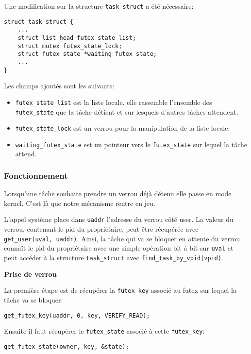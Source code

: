 Une modification sur la structure \verb|task_struct| a été nécessaire:

\begin{lstlisting}[tabsize=4]
struct task_struct {
	...
	struct list_head futex_state_list;
	struct mutex futex_state_lock;
	struct futex_state *waiting_futex_state;
	...
}
\end{lstlisting}

Les champs ajoutés sont les suivants:
\begin{itemize}
	\item \verb|futex_state_list| est la liste locale, elle rassemble l'ensemble des
	\verb|futex_state| que la tâche détient et sur lesquels d'autres tâches attendent.
	
	\item \verb|futex_state_lock| est un verrou pour la manipulation de la liste locale.
	
	\item \verb|waiting_futex_state| est un pointeur vers le \verb|futex_state| sur lequel
	la tâche attend.
\end{itemize}

\subsubsection{Fonctionnement}

Lorsqu'une tâche souhaite prendre un verrou déjà détenu elle passe en mode kernel. 
C'est là que notre mécanisme rentre en jeu.

L'appel système place dans \verb|uaddr| l'adresse du verrou côté user. 
La valeur du verrou, contenant le pid du propriétaire, peut être récupérée avec \verb|get_user(uval, uaddr)|.
Ainsi, la tâche qui va se bloquer en attente du verrou connaît le pid du propriétaire avec une simple
opération bit à bit sur \verb|uval| et peut accéder à la structure \verb|task_struct| avec
\verb|find_task_by_vpid(vpid)|.

\vspace{0.25cm}
\noindent \textbf{Prise de verrou}

La première étape est de récupérer la \verb|futex_key| associé au futex sur lequel la tâche va
se bloquer:
\begin{lstlisting}[tabsize=4]
	get_futex_key(uaddr, 0, key, VERIFY_READ);
\end{lstlisting}
Ensuite il faut récupérer le \verb|futex_state| associé à cette \verb|futex_key|:
\begin{lstlisting}[tabsize=4]
	get_futex_state(owner, key, &state);
\end{lstlisting}

